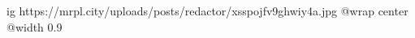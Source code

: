  
 
 
 
 

\ifcmt
  ig https://mrpl.city/uploads/posts/redactor/xsspojfv9ghwiy4a.jpg
  @wrap center
  @width 0.9
\fi
